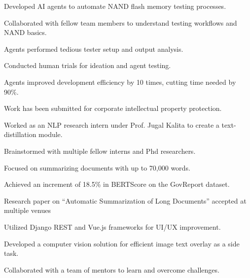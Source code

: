\begin{resume_list}
  \item Developed AI agents to automate NAND flash memory testing processes.
  \item Collaborated with fellow team members to understand testing workflows and NAND basics.
  \item Agents performed tedious tester setup and output analysis.
  \item Conducted human trials for ideation and agent testing.
  \item Agents improved development efficiency by 10 times, cutting time needed by 90\%.
  \item Work has been submitted for corporate intellectual property protection.
\end{resume_list}

\begin{resume_list}
  \item Worked as an NLP research intern under Prof. Jugal Kalita to create a text-distillation module.
  \item Brainstormed with multiple fellow interns and Phd researchers.
  \item Focused on summarizing documents with up to 70,000 words.
  \item Achieved an increment of 18.5\% in BERTScore on the GovReport dataset.
  \item Research paper on ``Automatic Summarization of Long Documents'' accepted at multiple venues
\end{resume_list}

\begin{resume_list}
  \item Utilized Django REST and Vue.js frameworks for UI/UX improvement.
  \item Developed a computer vision solution for efficient image text overlay as a side task.
  \item Collaborated with a team of mentors to learn and overcome challenges.
\end{resume_list}

